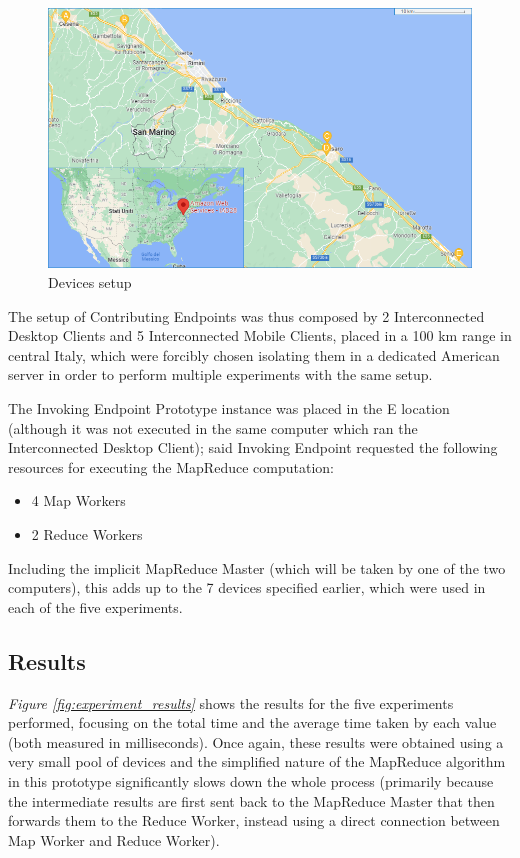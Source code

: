 \begin{figure}[!ht]
    \centering
    \includegraphics[width=\linewidth]{document/chapters/chapter_7/images/experiment_devices_setup.png}
    \caption{Devices setup}
    \label{fig:experiment_devices_setup}
\end{figure}

The setup of Contributing Endpoints was thus composed by 2 Interconnected Desktop Clients and 5 Interconnected Mobile Clients, placed in a 100 km range in central Italy, which were forcibly chosen isolating them in a dedicated American server in order to perform multiple experiments with the same setup.

The Invoking Endpoint Prototype instance was placed in the E location (although it was not executed in the same computer which ran the Interconnected Desktop Client); said Invoking Endpoint requested the following resources for executing the MapReduce computation:
\begin{itemize}
    \item 4 Map Workers
    \item 2 Reduce Workers
\end{itemize}
Including the implicit MapReduce Master (which will be taken by one of the two computers), this adds up to the 7 devices specified earlier, which were used in each of the five experiments.

\subsection{Results}
\textit{Figure \ref{fig:experiment_results}} shows the results for the five experiments performed, focusing on the total time and the average time taken by each value (both measured in milliseconds). Once again, these results were obtained using a very small pool of devices and the simplified nature of the MapReduce algorithm in this prototype significantly slows down the whole process (primarily because the intermediate results are first sent back to the MapReduce Master that then forwards them to the Reduce Worker, instead using a direct connection between Map Worker and Reduce Worker).

